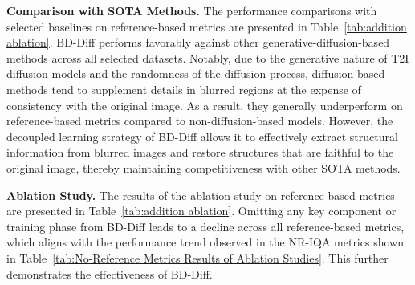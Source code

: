 \textbf{Comparison with SOTA Methods.} The performance comparisons with selected baselines on reference-based metrics are presented in Table~\ref{tab:addition ablation}. BD-Diff performs favorably against other generative-diffusion-based methods across all selected datasets. Notably, due to the generative nature of T2I diffusion models and the randomness of the diffusion process, diffusion-based methods tend to supplement details in blurred regions at the expense of consistency with the original image. As a result, they generally underperform on reference-based metrics compared to non-diffusion-based models. However, the decoupled learning strategy of BD-Diff allows it to effectively extract structural information from blurred images and restore structures that are faithful to the original image, thereby maintaining competitiveness with other SOTA methods.
 
\textbf{Ablation Study.} The results of the ablation study on reference-based metrics are presented in Table~\ref{tab:addition ablation}. Omitting any key component or training phase from BD-Diff leads to a decline across all reference-based metrics, which aligns with the performance trend observed in the NR-IQA metrics shown in Table~\ref{tab:No-Reference Metrics Results of Ablation Studies}. This further demonstrates the effectiveness of BD-Diff.


